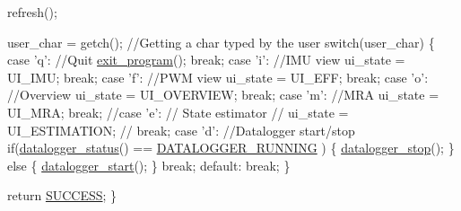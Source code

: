 \begin{DoxyCode}
        refresh();

        user\_char = getch(); \textcolor{comment}{//Getting a char typed by the user}
        \textcolor{keywordflow}{switch}(user\_char)
        \{
                \textcolor{keywordflow}{case} \textcolor{charliteral}{'q'}: \textcolor{comment}{//Quit}
                        \hyperlink{main2_8c_a5f05ce725141ddfab683e059b1cd95ea}{exit\_program}();
                        \textcolor{keywordflow}{break};
                \textcolor{keywordflow}{case} \textcolor{charliteral}{'i'}: \textcolor{comment}{//IMU view}
                        ui\_state = UI\_IMU;
                        \textcolor{keywordflow}{break};
                \textcolor{keywordflow}{case} \textcolor{charliteral}{'f'}: \textcolor{comment}{//PWM view}
                        ui\_state = UI\_EFF;
                        \textcolor{keywordflow}{break};
                \textcolor{keywordflow}{case} \textcolor{charliteral}{'o'}: \textcolor{comment}{//Overview}
                        ui\_state = UI\_OVERVIEW;
                        \textcolor{keywordflow}{break};
                \textcolor{keywordflow}{case} \textcolor{charliteral}{'m'}: \textcolor{comment}{//MRA}
                        ui\_state = UI\_MRA;
                        \textcolor{keywordflow}{break};
                \textcolor{comment}{//case 'e': // State estimator}
                \textcolor{comment}{//    ui\_state = UI\_ESTIMATION;}
                \textcolor{comment}{//    break;}
         \textcolor{keywordflow}{case} \textcolor{charliteral}{'d'}: \textcolor{comment}{//Datalogger start/stop}
            \textcolor{keywordflow}{if}(\hyperlink{datalogger_8c_a46fd1290d9ee97d5fc7171e1e0dcb0aa}{datalogger\_status}() == \hyperlink{datalogger_8h_a2cf92051a019c8ec1b5c4f5380758f62}{DATALOGGER\_RUNNING}
      )
            \{
                \hyperlink{datalogger_8c_aae2ffbc6cbf8f1cfecceb42c5139530a}{datalogger\_stop}();
            \}
            \textcolor{keywordflow}{else}
            \{
                \hyperlink{datalogger_8c_a1f254ef380d595d6605c10811fd0dee6}{datalogger\_start}();
            \}
            \textcolor{keywordflow}{break};
         \textcolor{keywordflow}{default}:
              \textcolor{keywordflow}{break};
        \}

        \textcolor{keywordflow}{return} \hyperlink{calibration_2calibration_8h_aa90cac659d18e8ef6294c7ae337f6b58}{SUCCESS};
\}
\end{DoxyCode}


